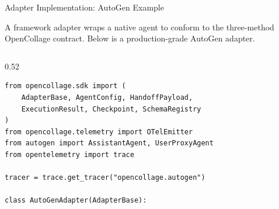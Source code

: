 \begin{frame}[fragile]{Adapter Implementation: AutoGen Example}
  \vspace{0.1cm}
  \fontsize{5.5}{6.5}\selectfont
  \begin{block}{}
    \fontsize{5.5}{6.5}\selectfont
    A framework adapter wraps a native agent to conform to the three-method
    OpenCollage contract. Below is a production-grade AutoGen adapter.
  \end{block}

  \vspace{-0.1cm}

  \begin{columns}[T]
    \begin{column}{0.52\textwidth}
      \begin{lstlisting}[style=pythonstyle,basicstyle=\ttfamily\fontsize{3.3}{4}\selectfont,title={\tiny\bfseries opencollage/adapters/autogen\_adapter.py}]
from opencollage.sdk import (
    AdapterBase, AgentConfig, HandoffPayload,
    ExecutionResult, Checkpoint, SchemaRegistry
)
from opencollage.telemetry import OTelEmitter
from autogen import AssistantAgent, UserProxyAgent
from opentelemetry import trace

tracer = trace.get_tracer("opencollage.autogen")

class AutoGenAdapter(AdapterBase):


\end{lstlisting}
\end{column}
\end{columns}
\end{frame}
